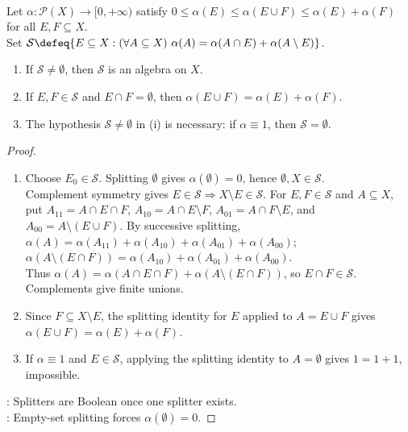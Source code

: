 \begin{proposition} \label{prop:caratheodory-splitters-finite-subadditive-size} \\
Let $\alpha:\mathcal{P}(X)\to[0,+\infty)$ satisfy $0\leq\alpha(E)\leq\alpha(E\cup F)\leq\alpha(E)+\alpha(F)$ for all $E,F\subseteq X$.\\
Set $\mathcal{S}\defeq\{E\subseteq X:(\forall A\subseteq X)\ \alpha(A)=\alpha(A\cap E)+\alpha(A\setminus E)\}$.
\begin{enumerate}[label=(\roman*)]
\setlength{\itemsep}{0pt}
\item If $\mathcal{S}\neq\emptyset$, then $\mathcal{S}$ is an algebra on $X$.
\item If $E,F\in\mathcal{S}$ and $E\cap F=\emptyset$, then $\alpha(E\cup F)=\alpha(E)+\alpha(F)$.
\item The hypothesis $\mathcal{S}\neq\emptyset$ in (i) is necessary: if $\alpha\equiv1$, then $\mathcal{S}=\emptyset$.
\end{enumerate}
\begin{proof}
\begin{enumerate}[label=(\roman*)]
\setlength{\itemsep}{0pt}
\item Choose $E_0\in\mathcal{S}$. Splitting $\emptyset$ gives $\alpha(\emptyset)=0$, hence $\emptyset,X\in\mathcal{S}$.\\
Complement symmetry gives $E\in\mathcal{S}\Rightarrow X\setminus E\in\mathcal{S}$. For $E,F\in\mathcal{S}$ and $A\subseteq X$, put $A_{11}=A\cap E\cap F$, $A_{10}=A\cap E\setminus F$, $A_{01}=A\cap F\setminus E$, and $A_{00}=A\setminus(E\cup F)$. By successive splitting,\\
$\alpha(A)=\alpha(A_{11})+\alpha(A_{10})+\alpha(A_{01})+\alpha(A_{00})$; $\alpha(A\setminus(E\cap F))=\alpha(A_{10})+\alpha(A_{01})+\alpha(A_{00})$.\\
Thus $\alpha(A)=\alpha(A\cap E\cap F)+\alpha(A\setminus(E\cap F))$, so $E\cap F\in\mathcal{S}$. Complements give finite unions.
\item Since $F\subseteq X\setminus E$, the splitting identity for $E$ applied to $A=E\cup F$ gives $\alpha(E\cup F)=\alpha(E)+\alpha(F)$.
\item If $\alpha\equiv1$ and $E\in\mathcal{S}$, applying the splitting identity to $A=\emptyset$ gives $1=1+1$, impossible.
\end{enumerate}
: Splitters are Boolean once one splitter exists.\\
: Empty-set splitting forces $\alpha(\emptyset)=0$.
\end{proof}
\end{proposition}


